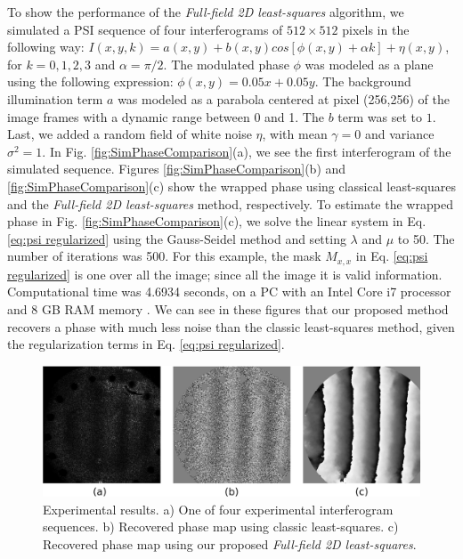 To show the performance of the \textit{Full-field 2D least-squares} algorithm,
we simulated a PSI sequence of four interferograms of $512 \times 512$ pixels 
in the following way: $I(x,y,k) = a(x,y) + b(x,y) cos[\phi(x,y)+\alpha k] +
\eta(x,y)$, for $k=0,1,2,3$ and $\alpha=\pi/2$. The modulated phase $\phi$ was
modeled as a plane using the following expression: $\phi(x,y)=0.05x+0.05y$. The
background illumination term $a$ was modeled as a parabola centered at pixel
(256,256) of the image frames with a dynamic range between 0 and 1. The $b$ term
was set to $1$. Last, we added a random field of white noise $\eta$, with mean
$\gamma=0$ and variance $\sigma^2=1$. In Fig. \ref{fig:SimPhaseComparison}(a),
we see the first interferogram of the simulated sequence. Figures 
\ref{fig:SimPhaseComparison}(b) and \ref{fig:SimPhaseComparison}(c) show the
wrapped phase using classical least-squares and the
\textit{Full-field 2D least-squares} method, respectively. To estimate the
wrapped phase in Fig. \ref{fig:SimPhaseComparison}(c), we solve the linear
system in Eq. \eqref{eq:psi regularized} using the Gauss-Seidel method and
setting $\lambda$ and $\mu$ to 50. The number of iterations was 500. For
this example, the mask $M_{x,x}$ in Eq. \eqref{eq:psi regularized} is one over
all the image; since all the image it is valid information. Computational
time was 4.6934 seconds, on a PC with an Intel Core i7 processor and 8 GB RAM
memory . We can see in these figures that our proposed method recovers a phase
with much less noise than the classic least-squares method, given the
regularization terms in Eq. \eqref{eq:psi regularized}.
\begin{figure}[th!]
	\begin{center}
		\includegraphics[scale=0.25]{Chpt1_figures/Fig_2.eps}
	\end{center}
	\caption{Experimental results. a) One of four experimental 
	interferogram sequences. b) Recovered phase map using classic 
	least-squares. c) Recovered phase map using our proposed 
	\textit{Full-field 2D least-squares}.}
	\label{fig:ExpPhaseComparison}
\end{figure}
